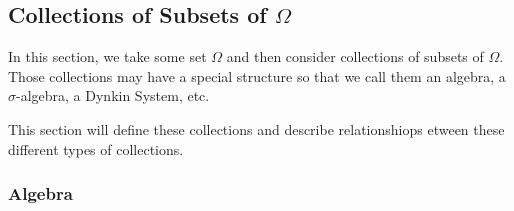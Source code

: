 \documentclass[12pt]{article}
\theoremstyle{plain}
\theoremstyle{definition}
\theoremstyle{remark}
\begin{document}




\clearpage

\subsection{Collections of Subsets of $\Omega$}

In this section, we take some set $\Omega$ and then consider collections
of subsets of $\Omega$. Those collections may have a special structure
so that we call them an algebra, a $\sigma$-algebra, a Dynkin System,
etc.

This section will define these collections and describe relationshiops
etween these different types of collections.

\subsubsection{Algebra}
\end{document}
